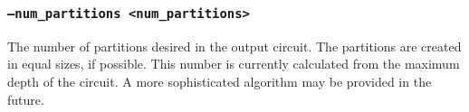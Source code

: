 \subsubsection{\texttt{--num\_partitions <num\_partitions>}}
The number of partitions desired in the output circuit. The partitions are
created in equal sizes, if possible. This number is currently calculated from
the maximum depth of the circuit. A more sophisticated algorithm may be
provided in the future.





